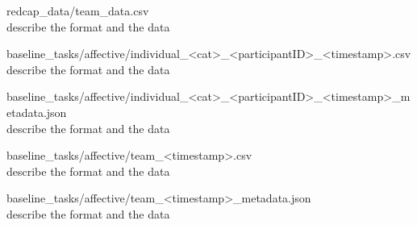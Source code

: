 \begin{description}
\item{redcap\_data/team\_data.csv}\\
describe the format and the data

\item{baseline\_tasks/affective/individual\_<cat>\_<participantID>\_<timestamp>.csv}\\
describe the format and the data

\item{baseline\_tasks/affective/individual\_<cat>\_<participantID>\_<timestamp>\_metadata.json}\\
describe the format and the data

\item{baseline\_tasks/affective/team\_<timestamp>.csv}\\
describe the format and the data

\item{baseline\_tasks/affective/team\_<timestamp>\_metadata.json}\\
describe the format and the data

\end{description}







